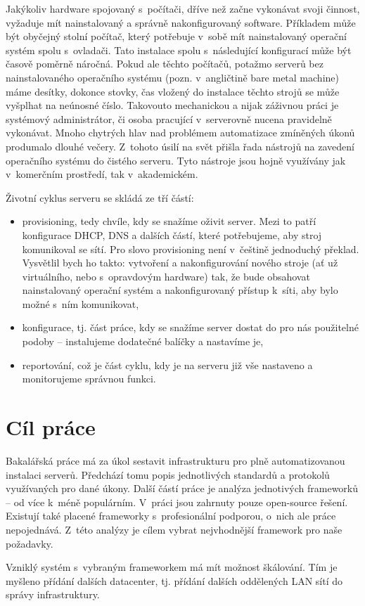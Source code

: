 
\begin{introduction}
Jakýkoliv hardware spojovaný s~počítači, dříve než začne vykonávat svoji činnost, vyžaduje mít nainstalovaný a správně nakonfigurovaný software. Příkladem může být obyčejný stolní počítač, který potřebuje v~sobě mít nainstalovaný operační systém spolu s~ovladači. Tato instalace spolu s~následující konfigurací může být časově poměrně náročná. Pokud ale těchto počítačů, potažmo serverů bez nainstalovaného operačního systému (pozn. v~angličtině bare metal machine) máme desítky, dokonce stovky, čas vložený do instalace těchto strojů se může vyšplhat na neúnosné číslo. Takovouto mechanickou a nijak záživnou práci je systémový administrátor, či osoba pracující v~serverovně nucena pravidelně vykonávat. Mnoho chytrých hlav nad problémem automatizace zmíněných úkonů produmalo dlouhé večery. Z~tohoto úsilí na svět přišla řada nástrojů na zavedení operačního systému do čistého serveru. Tyto nástroje jsou hojně využívány jak v~komerčním prostředí, tak v~akademickém.

Životní cyklus serveru se skládá ze tří částí:
\begin{itemize}
\item provisioning, tedy chvíle, kdy se snažíme oživit server. Mezi to patří konfigurace DHCP, DNS a dalších částí, které potřebujeme, aby stroj komunikoval se sítí. Pro slovo provisioning není v~češtině jednoduchý překlad. Vysvětlil bych ho takto: vytvoření a nakonfigurování nového stroje (ať už virtuálního, nebo s~opravdovým hardware) tak, že bude obsahovat nainstalovaný operační systém a nakonfigurovaný přístup k~síti, aby bylo možné s~ním komunikovat,
\item konfigurace, tj. část práce, kdy se snažíme server dostat do pro nás použitelné podoby -- instalujeme dodatečné balíčky a nastavíme je,
\item reportování, což je část cyklu, kdy je na serveru již vše nastaveno a monitorujeme správnou funkci.
\end{itemize}

\section{Cíl práce}
Bakalářská práce má za úkol sestavit infrastrukturu pro plně automatizovanou instalaci serverů. Předchází tomu popis jednotlivých standardů a protokolů využívaných pro dané úkony. Další částí práce je analýza jednotivých frameworků -- od více k~méně populárním. V~práci jsou zahrnuty pouze open-source řešení. Existují také placené frameworky s~profesionální podporou, o~nich ale práce nepojednává. Z~této analýzy je cílem vybrat nejvhodnější framework pro naše požadavky.

Vzniklý systém s~vybraným frameworkem má mít možnost škálování. Tím je myšleno přídání dalších datacenter, tj. přídání dalších oddělených LAN sítí do správy infrastruktury.
\end{introduction}

